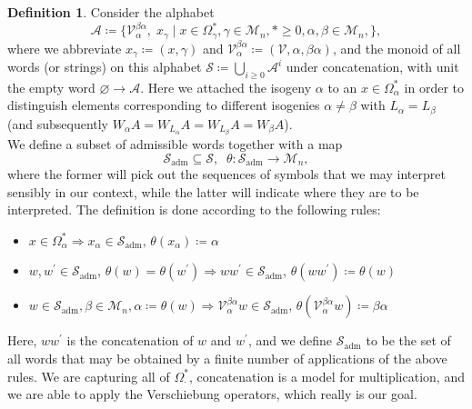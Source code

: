 \documentclass[10pt, a4paper, UKenglish]{article}
\numberwithin{equation}{section}
\newcommand{\cM}{\mathcal{M}}
\newcommand{\cS}{\mathcal{S}}
\newcommand{\cV}{\mathcal{V}}
\newcommand{\cA}{\mathcal{A}}
\newcommand{\defas}{\coloneqq}  %
\newcommand{\with}{\mid}  %
\theoremstyle{plain}
\theoremstyle{definition}
\newtheorem{defn}[equation]{Definition}
\renewcommand{\to}{\longrightarrow}
\begin{document}
\begin{defn}\label{def_admissible_words}
Consider the alphabet
\begin{equation*}
\cA \defas \{\cV_\alpha^{\beta\alpha},\; x_\gamma \with x \in \Omega^*_{\gamma}, \gamma \in \cM_n, * \geq 0, \alpha, \beta \in \cM_n,\},
\end{equation*}
where we abbreviate $x_\gamma \defas (x,\gamma)$ and $\cV_\alpha^{\beta\alpha} \defas (\cV,\alpha,\beta\alpha)$, and the monoid of all words (or strings) on this alphabet $\cS \defas \bigcup_{i \geq 0} \cA^i$ under concatenation, with unit the empty word $\varnothing \to \cA$. Here we attached the isogeny $\alpha$ to an $x \in \Omega^*_{\alpha}$ in order to distinguish elements corresponding to different isogenies $\alpha \neq \beta$ with $L_\alpha = L_\beta$ (and subsequently $W_\alpha A = W_{L_\alpha} A = W_{L_\beta} A = W_\beta A$).\\
We define a subset of admissible words together with a map
\begin{equation*}
  \cS_{\mathrm{adm}} \subseteq \cS,\;\; %
  \theta: \cS_{\mathrm{adm}} \to \cM_n,
\end{equation*}
where the former will pick out the sequences of symbols that we may interpret sensibly in our context, while the latter will indicate where they are to be interpreted. The definition is done according to the following rules:
\begin{itemize}
\item $x \in \Omega^*_{\alpha} \Rightarrow x_\alpha \in \cS_{\mathrm{adm}}$, $\theta(x_\alpha) \coloneqq \alpha$
\item $w,w^\prime \in \cS_{\mathrm{adm}}$, $\theta(w) = \theta(w^\prime) \Rightarrow ww^\prime \in \cS_{\mathrm{adm}}$, %
    $\theta(ww^\prime) \defas \theta(w)$
\item $w \in \cS_{\mathrm{adm}}, \beta \in \cM_n, \alpha \defas \theta(w) \Rightarrow \cV_\alpha^{\beta\alpha}w \in \cS_{\mathrm{adm}}$, %
      $\theta(\cV_\alpha^{\beta\alpha}w) \defas \beta\alpha$
\end{itemize}
Here, $ww^\prime$ is the concatenation of $w$ and $w^\prime$, and we define $\cS_\mathrm{adm}$ to be the set of all words that may be obtained by a finite number of applications of the above rules. We are capturing all of $\Omega^*_\cdot$, concatenation is a model for multiplication, and we are able to apply the Verschiebung operators, which really is our goal.


\end{defn}
\end{document}
